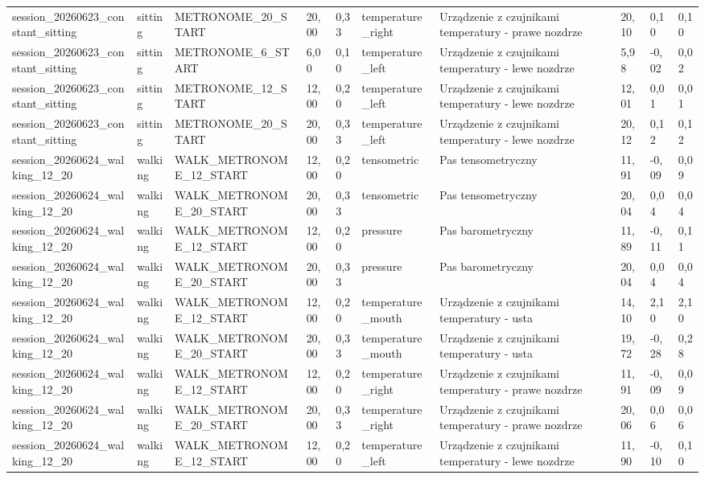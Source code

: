 \begin{table}[!htbp]
{\begin{tabular}{llllllllll}
session\_20260623\_constant\_sitting & sitting & METRONOME\_20\_START & 20,00 & 0,33 & temperature\_right & Urządzenie z czujnikami temperatury - prawe nozdrze & 20,10 & 0,10 & 0,10 \\
session\_20260623\_constant\_sitting & sitting & METRONOME\_6\_START & 6,00 & 0,10 & temperature\_left & Urządzenie z czujnikami temperatury - lewe nozdrze & 5,98 & -0,02 & 0,02 \\
session\_20260623\_constant\_sitting & sitting & METRONOME\_12\_START & 12,00 & 0,20 & temperature\_left & Urządzenie z czujnikami temperatury - lewe nozdrze & 12,01 & 0,01 & 0,01 \\
session\_20260623\_constant\_sitting & sitting & METRONOME\_20\_START & 20,00 & 0,33 & temperature\_left & Urządzenie z czujnikami temperatury - lewe nozdrze & 20,12 & 0,12 & 0,12 \\
session\_20260624\_walking\_12\_20 & walking & WALK\_METRONOME\_12\_START & 12,00 & 0,20 & tensometric & Pas tensometryczny & 11,91 & -0,09 & 0,09 \\
session\_20260624\_walking\_12\_20 & walking & WALK\_METRONOME\_20\_START & 20,00 & 0,33 & tensometric & Pas tensometryczny & 20,04 & 0,04 & 0,04 \\
session\_20260624\_walking\_12\_20 & walking & WALK\_METRONOME\_12\_START & 12,00 & 0,20 & pressure & Pas barometryczny & 11,89 & -0,11 & 0,11 \\
session\_20260624\_walking\_12\_20 & walking & WALK\_METRONOME\_20\_START & 20,00 & 0,33 & pressure & Pas barometryczny & 20,04 & 0,04 & 0,04 \\
session\_20260624\_walking\_12\_20 & walking & WALK\_METRONOME\_12\_START & 12,00 & 0,20 & temperature\_mouth & Urządzenie z czujnikami temperatury - usta & 14,10 & 2,10 & 2,10 \\
session\_20260624\_walking\_12\_20 & walking & WALK\_METRONOME\_20\_START & 20,00 & 0,33 & temperature\_mouth & Urządzenie z czujnikami temperatury - usta & 19,72 & -0,28 & 0,28 \\
session\_20260624\_walking\_12\_20 & walking & WALK\_METRONOME\_12\_START & 12,00 & 0,20 & temperature\_right & Urządzenie z czujnikami temperatury - prawe nozdrze & 11,91 & -0,09 & 0,09 \\
session\_20260624\_walking\_12\_20 & walking & WALK\_METRONOME\_20\_START & 20,00 & 0,33 & temperature\_right & Urządzenie z czujnikami temperatury - prawe nozdrze & 20,06 & 0,06 & 0,06 \\
session\_20260624\_walking\_12\_20 & walking & WALK\_METRONOME\_12\_START & 12,00 & 0,20 & temperature\_left & Urządzenie z czujnikami temperatury - lewe nozdrze & 11,90 & -0,10 & 0,10 \\

\end{tabular}}
\end{table}
